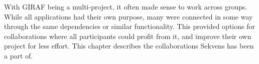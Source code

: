With GIRAF being a multi-project, it often made sense to work across groups. While all applications had their own purpose, many were connected in some way through the same dependencies or similar functionality. This provided options for collaborations where all participants could profit from it, and improve their own project for less effort. This chapter describes the collaborations Sekvens has been a part of.